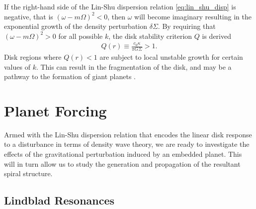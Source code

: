 If the right-hand side of the Lin-Shu dispersion relation \ref{eq:lin_shu_disp} is negative, that is $(\omega - m \Omega)^2 < 0$, then $\omega$ will become imaginary resulting in the exponential growth of the density perturbation $\delta \Sigma$.
By requiring that $(\omega - m \Omega)^2 > 0$ for all possible $k$, the disk stability criterion $Q$ is derived \citep{toomre1964}
\begin{align}
    Q(r) \equiv \frac{c_0 \kappa}{\pi G \Sigma} > 1.
\end{align}
Disk regions where $Q(r) < 1$ are subject to local unstable growth for certain values of $k$.
This can result in the fragmentation of the disk, and may be a pathway to the formation of giant planets \citep{boss1997}.

\section{Planet Forcing} \label{sec:planet_forcing}

Armed with the Lin-Shu dispersion relation that encodes the linear disk response to a disturbance in terms of density wave theory, we are ready to investigate the effects of the gravitational perturbation induced by an embedded planet.
This will in turn allow us to study the generation and propagation of the resultant spiral structure.

\subsection{Lindblad Resonances}

